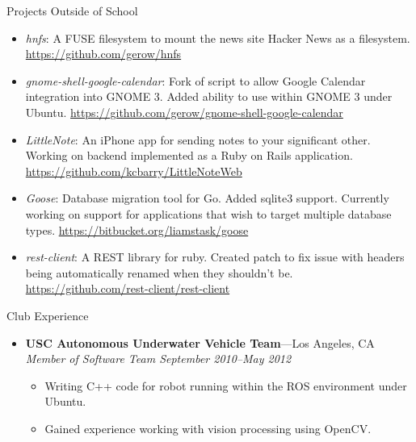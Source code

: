 \documentclass[8pt,oneside]{article}
\newenvironment{ressection}[1]{
	\vspace{4pt}
	{\fontfamily{phv}\selectfont\large#1}
	\begin{itemize}
	\vspace{3pt}
}{
	\end{itemize}
}
\newcommand{\ressubitem}[1]{
	\vspace{-1pt}
	\item \begin{flushleft} #1 \end{flushleft}
}
\newcommand{\resbigitem}[3]{
	\vspace{-5pt}
	\item
	\textbf{#1}---#2 \\
	\textit{#3}
}
\newcommand{\resveryshortbigitem}[1]{
	\vspace{-5pt}
	\item
	\textbf{#1}
}
\newenvironment{ressubsec}[3]{
	\resbigitem{#1}{#2}{#3}
	\vspace{-2pt}
	\begin{itemize}
}{
	\end{itemize}
}
\newenvironment{resveryshortsubsec}[1]{
	\resveryshortbigitem{#1}
	\vspace{-2pt}
	\begin{itemize}
}{
    \end{itemize}
}
\begin{document}
\begin{ressection}{Projects Outside of School}
  \ressubitem{\emph{hnfs}: A FUSE filesystem to mount the news site Hacker News as a filesystem. \url{https://github.com/gerow/hnfs}}
        \ressubitem{\emph{gnome-shell-google-calendar}: Fork of script to allow Google Calendar integration into GNOME 3. Added ability to use within GNOME 3 under Ubuntu. \url{https://github.com/gerow/gnome-shell-google-calendar}}
        \ressubitem{\emph{LittleNote}: An iPhone app for sending notes to your significant other.  Working on backend implemented as a Ruby on Rails application. \url{https://github.com/kcbarry/LittleNoteWeb}}
        \ressubitem{\emph{Goose}: Database migration tool for Go. Added sqlite3 support. Currently working on support for applications that wish to target multiple database types. \url{https://bitbucket.org/liamstask/goose}}
        \ressubitem{\emph{rest-client}: A REST library for ruby.  Created patch to fix issue with headers being automatically renamed when they shouldn't be. \url{https://github.com/rest-client/rest-client}}
\end{ressection}

\begin{ressection}{Club Experience}
	\begin{ressubsec}{USC Autonomous Underwater Vehicle Team}{Los Angeles, CA}{Member of Software Team September 2010--May 2012}
		\ressubitem{Writing C++ code for robot running within the ROS environment under Ubuntu.}
		\ressubitem{Gained experience working with vision processing using OpenCV.}
	\end{ressubsec}
\end{ressection}
\end{document}
